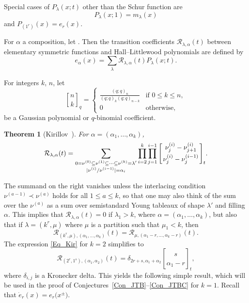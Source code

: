 \documentclass[pdftex]{sigma}
\numberwithin{equation}{section}
\newtheorem{Theorem}{Theorem}[section]
\renewcommand{\leq}{\leqslant}
\renewcommand{\geq}{\geqslant}
\newcommand{\qbin}[2]{\genfrac{[}{]}{0pt}{}{#1}{#2}}
\newcommand{\qBin}[2]{\Bigg[\genfrac{}{}{0pt}{}{#1}{#2}\Bigg]}
\newcommand{\abs}[1]{\vert#1\vert}
\newcommand{\la}{\lambda}
\begin{document}
Special cases of $P_{\la}(x;t)$ other than the Schur function are
\begin{equation}\label{Eq_Pm}
P_{\la}(x;1)=m_{\la}(x)
\end{equation}
and $P_{(1^r)}(x)=e_r(x)$.

For $\alpha$ a composition, let
\smash{$e_{\alpha}(x)=\prod_{i\geq 1} e_{\alpha_i}(x)$}.
Then the transition coefficients $\mathcal{R}_{\la,\alpha}(t)$
between elementary symmetric functions and Hall--Littlewood polynomials
are defined by
\begin{equation}\label{Eq_transition}
e_{\alpha}(x)=\sum_{\la}\mathcal{R}_{\la,\alpha}(t) P_{\la}(x;t).
\end{equation}

For integers $k$, $n$, let
\[
\qbin{n}{k}_q=\begin{cases}
\displaystyle \frac{(q;q)_n}{(q;q)_k(q;q)_{n-k}} & \text{if $0\leq k\leq n$}, \\[3mm]
0 & \text{otherwise},
\end{cases}
\]
be a Gaussian polynomial or $q$-binomial coefficient.

\begin{Theorem}[{Kirillov~\cite[Theorem 3.4]{Kirillov00}}]
For $\alpha=(\alpha_1,\dots,\alpha_k)$,
\begin{equation}\label{Eq_Kir}
\mathcal{R}_{\la,\alpha}(t)=
\sum_{\substack{0=\nu^{(0)}\subseteq\nu^{(1)}
\subseteq\cdots\subseteq \nu^{(k)}=\la' \\[1pt]
\abs{\nu^{(i)}/\nu^{(i-1)}}=\alpha_i}}
\prod_{i=2}^k \prod_{j=1}^{i-1}
\qBin{\nu^{(i)}_j-\nu^{(i)}_{j+1}}{\nu^{(i)}_j-\nu^{(i-1)}_j}_t.
\end{equation}
\end{Theorem}
The summand on the right vanishes unless the interlacing condition
$\nu^{(a-1)}\prec\nu^{(a)}$ holds for all $1\leq a\leq k$, so that
one may also think of the sum over the $\nu^{(a)}$ as a sum over
semistandard Young tableaux of shape $\la'$ and filling $\alpha$.
This implies that $\mathcal{R}_{\la,\alpha}(t)=0$ if $\la_1>k$,
where $\alpha=(\alpha_1,\dots,\alpha_k)$, \label{page_R} but also
that if $\la=(k^r,\mu)$ where $\mu$ is a partition such that
$\mu_1<k$, then
\begin{equation}\label{Eq_reduce}
\mathcal{R}_{(k^r,\mu),(\alpha_1,\dots,\alpha_k)}(t)=
\mathcal{R}_{\mu,(\alpha_1-r,\dots,\alpha_k-r)}(t).
\end{equation}
The expression \eqref{Eq_Kir} for $k=2$ simplifies to
\begin{equation}\label{Eq_R}
\mathcal{R}_{(2^r,1^s),(\alpha_1,\alpha_2)}(t)=
\delta_{2r+s,\alpha_1+\alpha_2}\qbin{s}{\alpha_1-r}_t,
\end{equation}
where $\delta_{i,j}$ is a Kronecker delta.
This yields the following simple result, which will be used in the
proof of Conjectures~\ref{Con_JTB}--\ref{Con_JTBC} for $k=1$.
Recall that $\dot{e}_r(x)=e_r\bigl(x^{\pm}\bigr)$.
\end{document}
